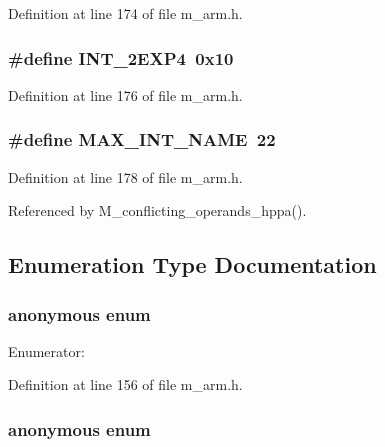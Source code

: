 Definition at line 174 of file m\_\-arm.h.
\subsubsection{\setlength{\rightskip}{0pt plus 5cm}\#define INT\_\-2EXP4~0x10}\label{m__arm_8h_0529ef9c1bae004b6dd773989e2715ca}




Definition at line 176 of file m\_\-arm.h.
\subsubsection{\setlength{\rightskip}{0pt plus 5cm}\#define MAX\_\-INT\_\-NAME~22}\label{m__arm_8h_63c8b4f0123f5e922a8bbf69b239692e}




Definition at line 178 of file m\_\-arm.h.

Referenced by M\_\-conflicting\_\-operands\_\-hppa().

\subsection{Enumeration Type Documentation}
\subsubsection{\setlength{\rightskip}{0pt plus 5cm}anonymous enum}\label{m__arm_8h_06fc87d81c62e9abb8790b6e5713c55b}


\begin{Desc}
\item[Enumerator: ]\par
\begin{description}
\item[{\em 
M\_\-ARM\_\-1\_\-01\label{m__arm_8h_06fc87d81c62e9abb8790b6e5713c55bbf807dd930ec225b1a6aa3daafa5d212}
}]\end{description}
\end{Desc}



Definition at line 156 of file m\_\-arm.h.\subsubsection{\setlength{\rightskip}{0pt plus 5cm}anonymous enum}\label{m__arm_8h_df764cbdea00d65edcd07bb9953ad2b7}


